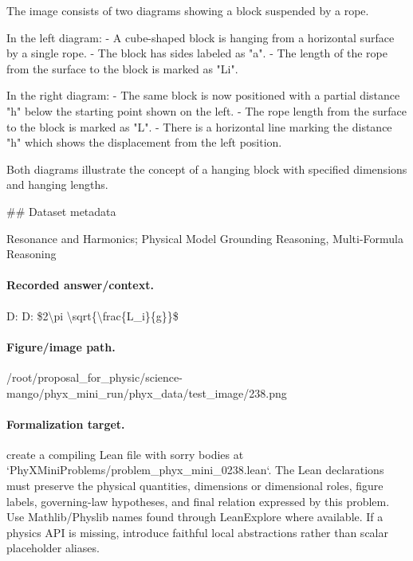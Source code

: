 The image consists of two diagrams showing a block suspended by a rope. 

In the left diagram:
- A cube-shaped block is hanging from a horizontal surface by a single rope.
- The block has sides labeled as "a".
- The length of the rope from the surface to the block is marked as "Li".

In the right diagram:
- The same block is now positioned with a partial distance "h" below the starting point shown on the left.
- The rope length from the surface to the block is marked as "L".
- There is a horizontal line marking the distance "h" which shows the displacement from the left position.

Both diagrams illustrate the concept of a hanging block with specified dimensions and hanging lengths.

\#\# Dataset metadata

Resonance and Harmonics; Physical Model Grounding Reasoning, Multi-Formula Reasoning

\paragraph{Recorded answer/context.}
D: D: \$2\textbackslash{}pi \textbackslash{}sqrt\{\textbackslash{}frac\{L\_i\}\{g\}\}\$

\paragraph{Figure/image path.}
/root/proposal\_for\_physic/science-mango/phyx\_mini\_run/phyx\_data/test\_image/238.png

\paragraph{Formalization target.}
create a compiling Lean file with sorry bodies at `PhyXMiniProblems/problem\_phyx\_mini\_0238.lean`. The Lean declarations must preserve the physical quantities, dimensions or dimensional roles, figure labels, governing-law hypotheses, and final relation expressed by this problem.
Use Mathlib/Physlib names found through LeanExplore where available. If a physics API is missing, introduce faithful local abstractions rather than scalar placeholder aliases.

